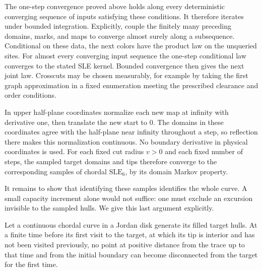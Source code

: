 The one-step convergence proved above holds along every
deterministic converging sequence of inputs satisfying these
conditions.  It therefore iterates under bounded integration.
Explicitly, couple the finitely many preceding domains, marks, and
maps to converge almost surely along a subsequence.  Conditional
on these data, the next colors have the product law on the
unqueried sites.  For almost every converging input sequence the
one-step conditional law converges to the stated SLE kernel.
Bounded convergence then gives the next joint law.  Crosscuts may
be chosen measurably, for example by taking the first graph
approximation in a fixed enumeration meeting the prescribed
clearance and order conditions.

In upper half-plane coordinates normalize each new map at infinity
with derivative one, then translate the new start to $0$.  The
domains in these coordinates agree with the half-plane near
infinity throughout a step, so reflection there makes this
normalization continuous.  No boundary derivative in physical
coordinates is used.  For each fixed cut radius $v>0$ and each
fixed number of steps, the sampled target domains and tips
therefore converge to the corresponding samples of chordal
$\mathrm{SLE}_6$, by its domain Markov property.

It remains to show that identifying these samples identifies the
whole curve.  A small capacity increment alone would not suffice:
one must exclude an excursion invisible to the sampled hulls.
We give this last argument explicitly.

\begin{lemma}
\label{lem:new-tip-disconnection}
Let a continuous chordal curve in a Jordan disk generate its filled
target hulls.  At a finite time before its first visit to the target,
at which its tip is interior and has
not been visited previously, no point at positive distance from the
trace up to that time and from the initial boundary can become
disconnected from the target for the first time.
\end{lemma}

